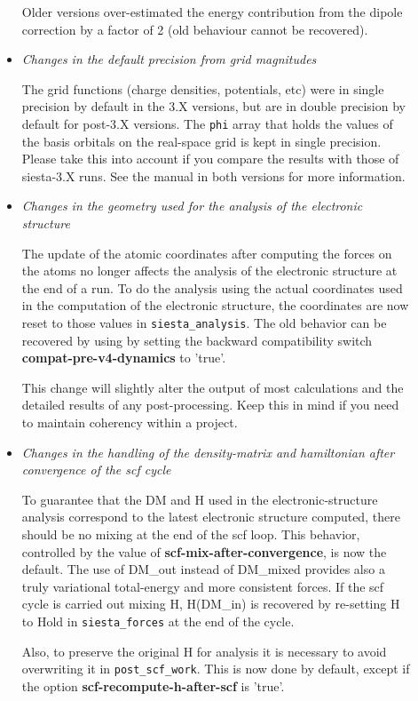 \documentclass{article}
\newcommand{\opt}[1]{\textbf{#1}}
\newcommand{\code}[1]{\texttt{#1}}
\begin{document}
\begin{description}
\begin{itemize}
    Older versions over-estimated the energy contribution from the dipole correction by a
    factor of 2 (old behaviour cannot be recovered).

  \item\emph{Changes in the default precision from grid magnitudes}

    The grid functions (charge densities, potentials, etc) were in
    single precision by default in the 3.X versions, but are in double
    precision by default for post-3.X versions. The \code{phi}  array that
    holds the values of the basis orbitals on the real-space grid is kept in
    single precision. Please take this into account if you compare the
    results with those of siesta-3.X runs. See the manual in both
    versions for more information.

  \item\emph{Changes in the geometry used for the analysis of the
    electronic structure}

  The update of the atomic coordinates after computing the forces on
  the atoms no longer affects the analysis of the electronic
  structure at the end of a run. To do the analysis using the actual
  coordinates used in the computation of the electronic structure, the
  coordinates are now reset to those values in \code{siesta\_analysis}.  The old
  behavior can be recovered by using by setting the backward
  compatibility switch \opt{compat-pre-v4-dynamics} to 'true'.

  This change will slightly alter the output of most calculations and the
  detailed results of any post-processing. Keep this in mind if you
  need to maintain coherency within a project.


  \item\emph{Changes in the handling of the density-matrix and
    hamiltonian after convergence of the scf cycle}

    To guarantee that the DM and H used in the electronic-structure
    analysis correspond to the latest electronic structure computed,
    there should be no mixing at the end of the scf loop. This
    behavior, controlled by the value of \opt{scf-mix-after-convergence}, is
    now the default. The use of DM\_out instead of DM\_mixed provides
    also a truly variational total-energy and more consistent
    forces. If the scf cycle is carried out mixing H, H(DM\_in) is
    recovered by re-setting H to Hold in \code{siesta\_forces} at the end of
    the cycle.

    Also, to preserve the original H for analysis it is necessary to
    avoid overwriting it in \code{post\_scf\_work}. This is now done by
    default, except if the option \opt{scf-recompute-h-after-scf} is
    'true'.


\end{itemize}
\end{description}
\end{document}
